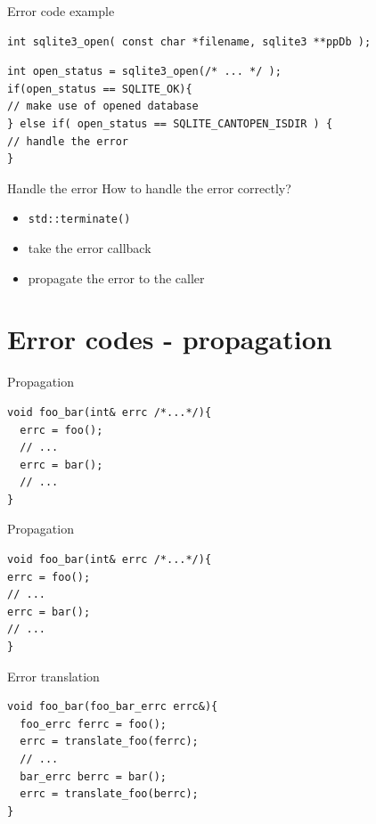 \documentclass[10pt]{beamer}
\begin{document}
\begin{frame}[fragile]{Error code example}
\begin{verbatim}
int sqlite3_open( const char *filename, sqlite3 **ppDb );
\end{verbatim}

\hrulefill

\begin{verbatim}
int open_status = sqlite3_open(/* ... */ );
if(open_status == SQLITE_OK){
// make use of opened database
} else if( open_status == SQLITE_CANTOPEN_ISDIR ) {
// handle the error
}
\end{verbatim}

\end{frame}


\begin{frame}{Handle the error}
	How to handle the error correctly?
	
	\pause
	
	\begin{itemize}[<+- | alert@+>]
		\item \texttt{std::terminate()}
		\item take the error callback
		\item propagate the error to the caller
	\end{itemize}
	
\end{frame}

\section{Error codes - propagation}

\begin{frame}[fragile]{Propagation}
	\begin{verbatim}
void foo_bar(int& errc /*...*/){
  errc = foo();
  // ...
  errc = bar();		
  // ...
}
	\end{verbatim}
	
\end{frame}

\begin{frame}[fragile]{Propagation}
\begin{verbatim}
void foo_bar(int& errc /*...*/){
errc = foo();
// ...
errc = bar();		
// ...
}
\end{verbatim}

\end{frame}

\begin{frame}[fragile]{Error translation}
	\begin{verbatim}
void foo_bar(foo_bar_errc errc&){
  foo_errc ferrc = foo();
  errc = translate_foo(ferrc);
  // ...
  bar_errc berrc = bar();
  errc = translate_foo(berrc);
}
	\end{verbatim}
\end{frame}
\end{document}
